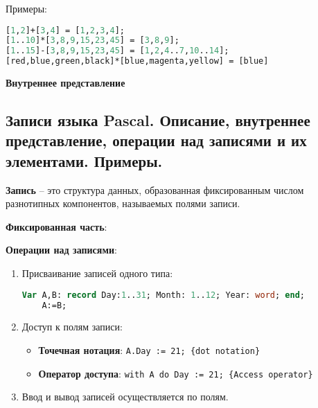 \noindent
Примеры:
\begin{lstlisting}[language=Pascal]
[1,2]+[3,4] = [1,2,3,4];
[1..10]*[3,8,9,15,23,45] = [3,8,9];
[1..15]-[3,8,9,15,23,45] = [1,2,4..7,10..14];
[red,blue,green,black]*[blue,magenta,yellow] = [blue]
\end{lstlisting}

\noindent
{\bf{Внутреннее представление}}







\newpage\subsection{Записи языка Pascal. Описание, внутреннее представление, операции над записями и их 
элементами. Примеры. }

\begin{myquote}
            
\end{myquote}

{\bf{Запись}} – это структура данных, образованная фиксированным числом разнотипных компонентов, называемых полями записи.


\noindent
{\bf{Фиксированная часть}}:


\noindent
{\bf{Операции над записями}}:

\begin{enumerate}
\item Присваивание записей одного типа:

\begin{lstlisting}[language=Pascal]
	Var A,B: record Day:1..31; Month: 1..12; Year: word; end;
	A:=B;
\end{lstlisting}

\item Доступ к полям записи:
\begin{itemize}

\item {\bf{Точечная нотация}}: \texttt{A.Day := 21; \{dot notation\}}


\item {\bf{Оператор доступа}}: \texttt{with A do Day := 21; \{Access operator\}}


\end{itemize}

\item Ввод и вывод записей осуществляется по полям.

\end{enumerate}
    
